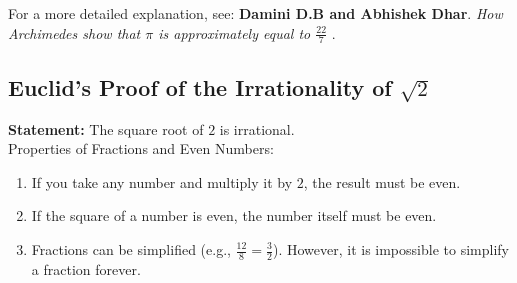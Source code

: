 \documentclass[12pt]{article}
\begin{document}
\noindent For a more detailed explanation, see: \textbf{Damini D.B and Abhishek Dhar}. \textit{How Archimedes show that $\pi$ is approximately equal to $\frac{22}{7}$} \cite{b2020archimedesshowedpiapproximately}. 


\subsection{Euclid's Proof of the Irrationality of $\sqrt{2}$}\label{appendix:2}

\noindent \textbf{Statement:} The square root of $2$ is irrational.\\

\noindent Properties of Fractions and Even Numbers:
\begin{enumerate}
    \item If you take any number and multiply it by $2$, the result must be even.
    \item If the square of a number is even, the number itself must be even.
    \item Fractions can be simplified (e.g., $\frac{12}{8} = \frac{3}{2}$). However, it is impossible to simplify a fraction forever.
\end{enumerate}
\end{document}
